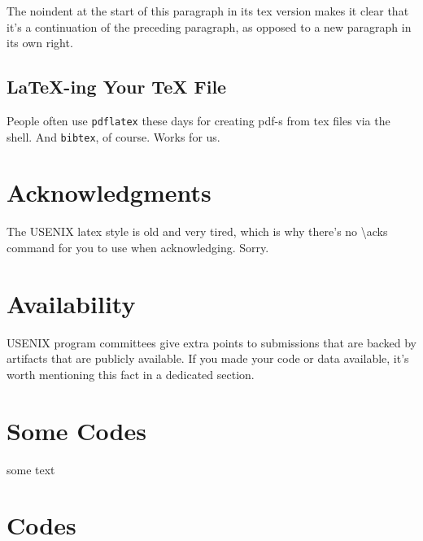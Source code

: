 \documentclass[a4paper,10pt,titlepage]{ctexart}
\begin{document}
\noindent
The noindent at the start of this paragraph in its tex version makes
it clear that it's a continuation of the preceding paragraph, as
opposed to a new paragraph in its own right.


\subsection{LaTeX-ing Your TeX File}

People often use \texttt{pdflatex} these days for creating pdf-s from
tex files via the shell. And \texttt{bibtex}, of course. Works for us.

\section*{Acknowledgments}

The USENIX latex style is old and very tired, which is why
there's no \textbackslash{}acks command for you to use when
acknowledging. Sorry.

\section*{Availability}

USENIX program committees give extra points to submissions that are
backed by artifacts that are publicly available. If you made your code
or data available, it's worth mentioning this fact in a dedicated
section.




\begin{appendices}
\section{Some Codes}
some text
\section{Codes}

\end{appendices}

\end{document}
